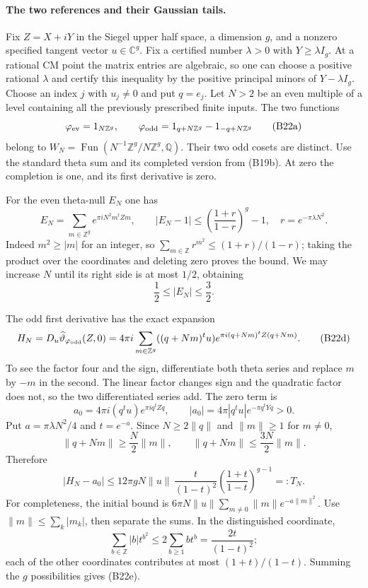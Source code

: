 \documentclass[11pt]{article}
\newcommand{\Q}{\mathbb Q}\newcommand{\C}{\mathbb C}\newcommand{\Z}{\mathbb Z}\newcommand{\R}{\mathbb R}\newcommand{\A}{\mathbb A}\newcommand{\OO}{\mathcal O}
\theoremstyle{definition}\newtheorem{definition}[theorem]{Definition}\newtheorem{remark}[theorem]{Remark}
\begin{document}
\paragraph{The two references and their Gaussian tails.}
Fix $Z=X+iY$ in the Siegel upper half space, a dimension $g$,
and a nonzero specified tangent vector $u\in\C^g$.
Fix a certified number $\lambda>0$ with $Y\geq\lambda I_g$.
At a rational CM point the matrix entries are algebraic, so
one can choose a positive rational $\lambda$ and certify this
inequality by the positive principal minors of $Y-\lambda I_g$.
Choose an index $j$ with $u_j\ne0$ and put $q=e_j$.
Let $N>2$ be an even multiple of a level containing all the
previously prescribed finite inputs.  The two functions
\[
 \varphi_{\rm ev}=1_{N\Z^g},\qquad
 \varphi_{\rm odd}=1_{q+N\Z^g}-1_{-q+N\Z^g}
 \tag{B22a}
\]
belong to $W_N=\operatorname{Fun}(N^{-1}\Z^g/N\Z^g,\Q)$.
Their two odd cosets are distinct.  Use the standard theta
sum and its completed version from (B19b).  At zero the
completion is one, and its first derivative is zero.

For the even theta-null $E_N$ one has
\[
 E_N=\sum_{m\in\Z^g}e^{\pi iN^2m^tZm},\qquad
 |E_N-1|\leq
       \left(\frac{1+r}{1-r}\right)^g-1,
 \quad r=e^{-\pi\lambda N^2}.
 \tag{B22b}
\]
Indeed $m^2\geq |m|$ for an integer, so
$\sum_{m\in\Z}r^{m^2}\leq(1+r)/(1-r)$; taking the
product over the coordinates and deleting zero proves the
bound.  We may increase $N$ until its right side is at most
$1/2$, obtaining
\[
                         \frac12\leq |E_N|\leq\frac32.
 \tag{B22c}
\]

The odd first derivative has the exact expansion
\[
 H_N=D_u\widehat\vartheta_{\varphi_{\rm odd}}(Z,0)
       =4\pi i\sum_{m\in\Z^g}
          ((q+Nm)^tu)e^{\pi i(q+Nm)^tZ(q+Nm)}.
 \tag{B22d}
\]
To see the factor four and the sign, differentiate both
theta series and replace $m$ by $-m$ in the second.  The
linear factor changes sign and the quadratic factor does
not, so the two differentiated series add.
The zero term is
\[
 a_0=4\pi i(q^tu)e^{\pi iq^tZq},\qquad
 |a_0|=4\pi|q^tu|e^{-\pi q^tYq}>0.
\]
Put $a=\pi\lambda N^2/4$ and $t=e^{-a}$.
Since $N\geq2\|q\|$ and $\|m\|\geq1$ for $m\ne0$,
\[
 \|q+Nm\|\geq\frac N2\|m\|,\qquad
 \|q+Nm\|\leq\frac{3N}{2}\|m\|.
\]
Therefore
\[
 |H_N-a_0|\leq
  12\pi gN\|u\|\,
       \frac{t}{(1-t)^2}
       \left(\frac{1+t}{1-t}\right)^{g-1}
       =:T_N.
 \tag{B22e}
\]
For completeness, the initial bound is
$6\pi N\|u\|\sum_{m\ne0}\|m\|e^{-a\|m\|^2}$.
Use $\|m\|\leq\sum_k|m_k|$, then separate the sums.
In the distinguished coordinate,
\[
 \sum_{b\in\Z}|b|t^{b^2}
       \leq2\sum_{b\geq1}bt^b
       =\frac{2t}{(1-t)^2};
\]
each of the other coordinates contributes at most
$(1+t)/(1-t)$.  Summing the $g$ possibilities gives (B22e).
\end{document}
